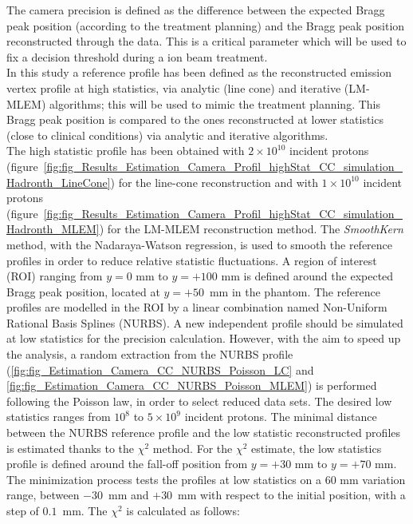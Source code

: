 The camera precision is defined as the difference between the expected Bragg peak position (according to the treatment planning) and the Bragg peak position reconstructed through the data. This is a critical parameter which will be used to fix a decision threshold during a ion beam treatment.\\ 
In this study a reference profile has been defined as the reconstructed emission vertex profile at high statistics, via analytic (line cone) and iterative (LM-MLEM) algorithms; this will be used to mimic the treatment planning. This Bragg peak position is compared to the ones reconstructed at lower statistics (close to clinical conditions) via analytic and iterative algorithms.\\
The high statistic profile has been obtained with $2\times10^{10}$ incident protons (figure~\ref{fig:fig_Results_Estimation_Camera_Profil_highStat_CC_simulation_Hadronth_LineCone}) for the line-cone reconstruction and with $1\times10^{10}$ incident protons (figure~\ref{fig:fig_Results_Estimation_Camera_Profil_highStat_CC_simulation_Hadronth_MLEM}) for the LM-MLEM reconstruction method. The \textit{SmoothKern} method, with the Nadaraya-Watson regression, is used to smooth the reference profiles in order to reduce relative statistic fluctuations.\newline
A region of interest (ROI) ranging from $y=0$ mm to $y=+100$ mm is defined around the expected Bragg peak position, located at $y=+50$~mm in the phantom. The reference profiles are modelled in the ROI by a linear combination named Non-Uniform Rational Basis Splines (NURBS). \newline
A new independent profile should be simulated at low statistics for the precision calculation. However, with the aim to speed up the analysis, a random extraction from the NURBS profile (\ref {fig:fig_Estimation_Camera_CC_NURBS_Poisson_LC} and \ref {fig:fig_Estimation_Camera_CC_NURBS_Poisson_MLEM}) is performed following the Poisson law, in order to select reduced data sets. The desired low statistics ranges from $10^8$ to $5\times10^9$ incident protons.\newline
The minimal distance between the NURBS reference profile and the low statistic reconstructed profiles is estimated thanks to the $\chi^2$ method. For the $\chi^2$ estimate, the low statistics profile is defined around the fall-off position from $y=+30$ mm to $y=+70$ mm. The minimization process tests the profiles at low statistics on a 60 mm variation range, between $-30$~mm and $+30$~mm with respect to the initial position, with a step of $0.1$~mm. The      $\chi^2$ is calculated as follows:

